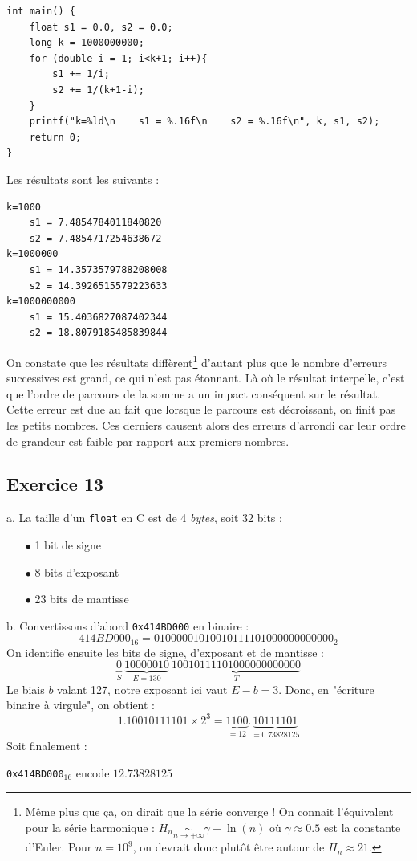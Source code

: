 \documentclass[11pt, a4 paper]{article}
\begin{document}
\begin{lstlisting}[style=CStyle]
int main() {
    float s1 = 0.0, s2 = 0.0;
    long k = 1000000000;
    for (double i = 1; i<k+1; i++){
        s1 += 1/i;
        s2 += 1/(k+1-i);
    }
    printf("k=%ld\n    s1 = %.16f\n    s2 = %.16f\n", k, s1, s2);
    return 0;
}
\end{lstlisting}

Les résultats sont les suivants :
\begin{lstlisting}[style=CStyle]
k=1000
    s1 = 7.4854784011840820
    s2 = 7.4854717254638672
k=1000000
    s1 = 14.3573579788208008
    s2 = 14.3926515579223633
k=1000000000
    s1 = 15.4036827087402344
    s2 = 18.8079185485839844
\end{lstlisting}
On constate que les résultats diffèrent\footnote{Même plus que ça, on dirait que la série converge !
On connait l'équivalent pour la série harmonique : $H_n \underset{n \to +\infty}{\sim} \gamma + \ln(n)$ où $\gamma \approx 0.5$ est la constante d'Euler.
Pour $n = 10^9$, on devrait donc plutôt être autour de $H_n \approx 21$.} d'autant plus que le nombre d'erreurs successives est grand, ce qui n'est pas étonnant.
Là où le résultat interpelle, c'est que l'ordre de parcours de la somme a un impact conséquent sur le résultat.\\
Cette erreur est due au fait que lorsque le parcours est décroissant, on finit pas les petits nombres.
Ces derniers causent alors des erreurs d'arrondi car leur ordre de grandeur est faible par rapport aux premiers nombres.

\subsection{Exercice 13}
a. La taille d'un \texttt{float} en C est de 4 \textit{bytes}, soit 32 bits :
\begin{itemize}
    \item[$\bullet$] 1 bit de signe
    \item[$\bullet$] 8 bits d'exposant
    \item[$\bullet$] 23 bits de mantisse
\end{itemize}

b. Convertissons d'abord \texttt{0x414BD000} en binaire :
\begin{equation*}
    414BD000_{16} = 01000001010010111101000000000000_2
\end{equation*}
On identifie ensuite les bits de signe, d'exposant et de mantisse :
\begin{equation*}
    \underset{S}{\underbrace{0}}~\underset{E=130}{\underbrace{10000010}}~\underset{T}{\underbrace{10010111101000000000000}}
\end{equation*}
Le biais $b$ valant 127, notre exposant ici vaut $E-b = 3$. Donc, en "écriture binaire à virgule", on obtient :
\begin{equation*}
    1.10010111101 \times 2^3 = \underset{=12}{\underbrace{1100}}.\underset{=0.73828125}{\underbrace{10111101}}
\end{equation*}
Soit finalement :
\begin{center}
    \texttt{0x414BD000}$_{16}$ encode $12.73828125$
\end{center}
\end{document}
